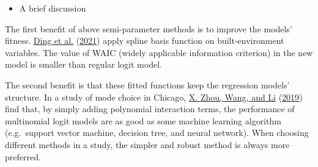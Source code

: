 \documentclass[
  11pt,
  openany]{memoir}
\providecommand{\tightlist}{%
  \setlength{\itemsep}{0pt}\setlength{\parskip}{0pt}}
\begin{document}
\begin{itemize}
\tightlist
\item
  A brief discussion
\end{itemize}

The first benefit of above semi-parameter methods is to improve the models' fitness. \protect\hyperlink{ref-dingNonlinearAssociationsZonal2021}{Ding et al.} (\protect\hyperlink{ref-dingNonlinearAssociationsZonal2021}{2021}) apply spline basis function on built-environment variables. The value of WAIC (widely applicable information criterion) in the new model is smaller than regular logit model.

The second benefit is that these fitted functions keep the regression models' structure. In a study of mode choice in Chicago, \protect\hyperlink{ref-zhouBikesharingTaxiModeling2019}{X. Zhou, Wang, and Li} (\protect\hyperlink{ref-zhouBikesharingTaxiModeling2019}{2019}) find that, by simply adding polynomial interaction terms, the performance of multinomial logit models are as good as some machine learning algorithm (e.g.~support vector machine, decision tree, and neural network). When choosing different methods in a study, the simpler and robust method is always more preferred.
\end{document}
